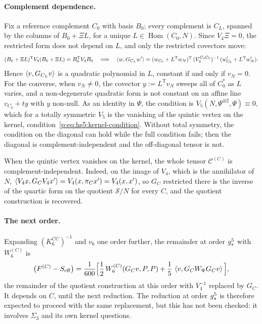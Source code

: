 \paragraph{Complement dependence.}
Fix a reference complement $C_0$ with basis $B_0$; every complement is $C_L$, spanned by the columns of $B_0 + \Xi L$, for a unique $L \in \operatorname{Hom}(C_0, N)$.
Since $V_4 \Xi = 0$, the restricted form does not depend on $L$, and only the restricted covectors move:
\begin{equation}
  \label{eq:mult:hyb:L}
  (B_0 + \Xi L)^{\mathrm{T}} V_4 (B_0 + \Xi L)
    = B_0^{\mathrm{T}} V_4 B_0
  \quad \Longrightarrow \quad
  \braket{w, G_{C_L} w'}
    = (w_{C_0} + L^{\mathrm{T}} w_N)^{\mathrm{T}} \, (V_4^{C_0 C_0})^{-1} \, (w'_{C_0} + L^{\mathrm{T}} w'_N).
\end{equation}
Hence $\braket{v, G_{C_L} v}$ is a quadratic polynomial in $L$, constant if and only if $v_N = 0$.
For the converse, when $v_N \neq 0$, the covector $y := L^{\mathrm{T}} v_N$ sweeps all of $C_0^*$ as $L$ varies, and a non-degenerate quadratic form is not constant on an affine line $v_{C_0} + t y$ with $y$ non-null.
As an identity in $\Psi$, the condition is $V_5(N, \Psi^{\otimes 2}, \Psi) \equiv 0$, which for a totally symmetric $V_5$ is the vanishing of the quintic vertex on the kernel, condition~\eqref{p:eq:hs5:kernel-condition}.
Without total symmetry, the condition on the diagonal can hold while the full condition fails; then the diagonal is complement-independent and the off-diagonal tensor is not.

When the quintic vertex vanishes on the kernel, the whole tensor $\mathcal C^{(C)}$ is complement-independent.
Indeed, on the image of $V_4$, which is the annihilator of $N$, $\braket{V_4 x, G_C V_4 x'} = V_4(x, \pi_C x') = V_4(x, x')$, so $G_C$ restricted there is the inverse of the quartic form on the quotient $\mathcal S / N$ for every $C$, and the quotient construction is recovered.

\paragraph{The next order.}
Expanding $(K_6^{CC})^{-1}$ and $v_6$ one order further, the remainder at order $g_s^5$ with $W_6^{(C)}$ is
\begin{equation}
  [\gs^5] \big( F^{(C)} - S_{\mathrm{eff}} \big)
    = \frac{1}{600} \Big[
      \frac{1}{2} \, W_6^{(C)}(G_C v, P, P)
      + \frac{1}{5} \, \braket{v, G_C W_\Psi G_C v}
    \Big],
\end{equation}
the remainder of the quotient construction at this order with $V_4^{-1}$ replaced by $G_C$.
It depends on $C$, until the next reduction.
The reduction at order $g_s^5$ is therefore expected to proceed with the same replacement, but this has not been checked: it involves $\Sigma_3$ and its own kernel questions.

